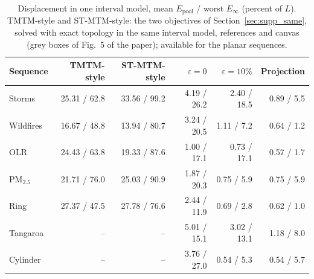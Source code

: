 \begin{table}[H]
\centering\small\setlength{\tabcolsep}{3.2pt}
\caption{Displacement in one interval model, mean $E_{\mathrm{pool}}$ / worst $E_\infty$ (percent of $L$). TMTM-style and ST-MTM-style: the two objectives of Section~\ref{sec:supp_same}, solved with exact topology in the same interval model, references and canvas (grey boxes of Fig.~5 of the paper); available for the planar sequences.}\label{tab:supp_same_model}
\begin{tabular}{lrrrrr}\toprule
Sequence & TMTM-style & ST-MTM-style & $\varepsilon{=}0$ & $\varepsilon{=}10\%$ & Projection\\\midrule
Storms & 25.31 / 62.8 & 33.56 / 99.2 & 4.19 / 26.2 & 2.40 / 18.5 & 0.89 / 5.5\\
Wildfires & 16.67 / 48.8 & 13.94 / 80.7 & 3.24 / 20.5 & 1.11 / 7.2 & 0.64 / 1.2\\
OLR & 24.43 / 63.8 & 19.33 / 87.6 & 1.00 / 17.1 & 0.73 / 17.1 & 0.57 / 1.7\\
PM$_{2.5}$ & 21.71 / 76.0 & 25.03 / 90.9 & 1.87 / 20.3 & 0.75 / 5.9 & 0.75 / 5.9\\
Ring & 27.37 / 47.5 & 27.78 / 76.6 & 2.44 / 11.9 & 0.69 / 2.8 & 0.62 / 1.0\\
Tangaroa & -- & -- & 5.01 / 15.1 & 3.02 / 13.1 & 1.18 / 8.0\\
Cylinder & -- & -- & 3.76 / 27.0 & 0.54 / 5.3 & 0.54 / 5.7\\
\bottomrule\end{tabular}
\end{table}
